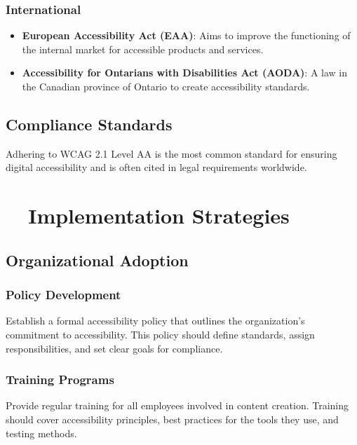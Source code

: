 \subsubsection{International}\label{ch15:sssec:legal-intl}
\begin{itemize}
	\item \textbf{European Accessibility Act (EAA)}: Aims to improve the functioning of the internal market for accessible products and services.
	\item \textbf{Accessibility for Ontarians with Disabilities Act (AODA)}: A law in the Canadian province of Ontario to create accessibility standards.
\end{itemize}

\subsection{Compliance Standards}\label{ch15:ssec:compliance-standards}
Adhering to WCAG 2.1 Level AA is the most common standard for ensuring digital accessibility and is often cited in legal requirements worldwide.

\section{~~Implementation Strategies}\label{ch15:sec:implementation-strategies}

\subsection{Organizational Adoption}\label{ch15:ssec:org-adoption}

\subsubsection{Policy Development}\label{ch15:sssec:policy-dev}
Establish a formal accessibility policy that outlines the organization's commitment to accessibility. This policy should define standards, assign responsibilities, and set clear goals for compliance.

\subsubsection{Training Programs}\label{ch15:sssec:training-programs}
Provide regular training for all employees involved in content creation. Training should cover accessibility principles, best practices for the tools they use, and testing methods.

